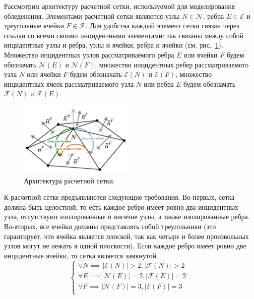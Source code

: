 Рассмотрим архитектуру расчетной сетки, используемой для моделирования обледенения.
Элементами расчетной сетки являются узлы $N \in \mathscr{N}$, ребра $E \in \mathscr{E}$ и треугольные ячейки $F \in \mathscr{F}$.
Для удобства каждый элемент сетки связан через ссылки со всеми своими инцидентными элементами: так связаны между собой инцидентные узлы и ребра, узлы и ячейки, ребра и ячейки (см. рис.~\ref{fig:text_1_remesh3_architecture}).
Множество инцидентных узлов рассматриваемого ребра $E$ или ячейки $F$ будем обозначать $\mathscr{N}(E)$ и $\mathscr{N}(F)$, множество инцидентных ребер рассматриваемого узла $N$ или ячейки $F$ будем обозначать $\mathscr{E}(N)$ и $\mathscr{E}(F)$, множество инцидентных ячеек рассматриваемого узла $N$ или ребра $E$ будем обозначать $\mathscr{F}(N)$ и $\mathscr{F}(E)$.

\begin{figure}[ht]
\centering
\includegraphics[width=0.5\textwidth]{fig/3dr_architecture.pdf}
\singlespacing
{}\caption{Архитектура расчетной сетки.}
\label{fig:text_1_remesh3_architecture}
\end{figure}

К расчетной сетке предъявляются следующие требования.
Во-первых, сетка должна быть целостной, то есть каждое ребро имеет ровно два инцидентных узла, отсутствуют изолированные и висячие узлы, а также изолированные ребра.
Во-вторых, все ячейки должны представлять собой треугольники (это гарантирует, что ячейка является плоской, так как четыре и более произвольных узлов могут не лежать в одной плоскости).
Если каждое ребро имеет ровно две инцидентные ячейки, то сетка является замкнутой.
\begin{equation}\label{eqn:text_1_remesh3_arch}
\begin{cases}
\forall N \implies |\mathscr{E}(N)| > 2, |\mathscr{F}(N)| > 2 \\
\forall E \implies |\mathscr{N}(E)| = 2, |\mathscr{F}(E)| = 2 \\
\forall F \implies |\mathscr{N}(F)| = 3, |\mathscr{E}(F)| = 3 \\
\end{cases}
\end{equation}

